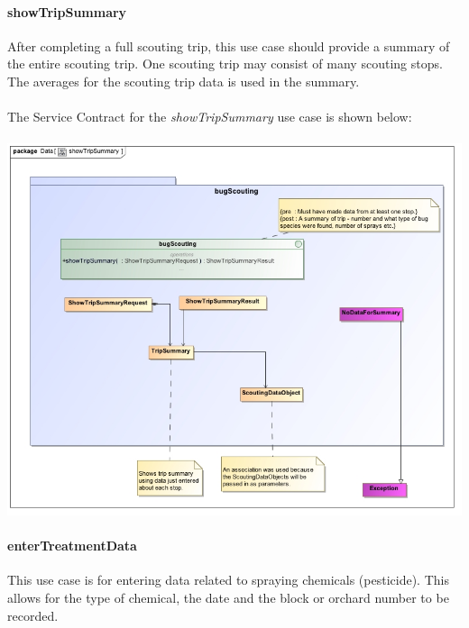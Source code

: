 \documentclass[11pt,a4paper,titlepage]{article}
\begin{document}
		\paragraph{showTripSummary }
		After completing a full scouting trip, this use case should provide a summary of the entire scouting trip. One scouting trip may consist of many scouting stops. The averages for the scouting trip data is used in the summary.\\\hfill\\
		The Service Contract for the \textit{showTripSummary} use case is shown below:\\\hfill\\
		\includegraphics[width=\linewidth]{showTripSummary}
		
		\paragraph{enterTreatmentData }
		This use case is for entering data related to spraying chemicals (pesticide). This allows for the type of chemical, the date and the block or orchard number to be recorded.\\\hfill\\
		
\end{document}
